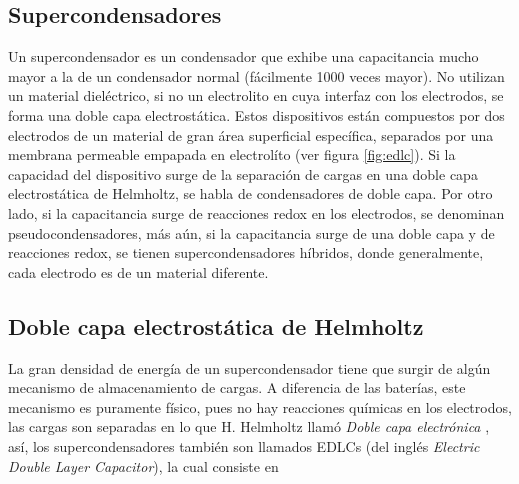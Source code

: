 %

\subsection{Supercondensadores}
Un supercondensador es un condensador que exhibe una capacitancia mucho mayor a la de un condensador normal (fácilmente 1000 veces mayor). No utilizan un material dieléctrico, si no un electrolito en cuya interfaz con los electrodos, se forma una doble capa electrostática. Estos dispositivos están compuestos por dos electrodos de un material de gran área superficial específica, separados por una membrana permeable empapada en electrolíto (ver figura \ref{fig:edlc}). Si la capacidad del dispositivo surge de la separación de cargas en una doble capa electrostática de Helmholtz, se habla de condensadores de doble capa. Por otro lado, si la capacitancia surge de reacciones redox en los electrodos, se denominan pseudocondensadores, más aún, si la capacitancia surge de una doble capa y de reacciones redox, se tienen supercondensadores híbridos, donde generalmente, cada electrodo es de un material diferente.

\subsection{Doble capa electrostática de Helmholtz}
La gran densidad de energía de un supercondensador tiene que surgir de algún mecanismo de almacenamiento de cargas. A diferencia de las baterías, este mecanismo es puramente físico, pues no hay reacciones químicas en los electrodos, las cargas son separadas en lo que H. Helmholtz llamó \emph{Doble capa electrónica} \citep{Frackowiak2001}, así, los supercondensadores también son llamados EDLCs (del inglés \emph{Electric Double Layer Capacitor}), la cual consiste en

